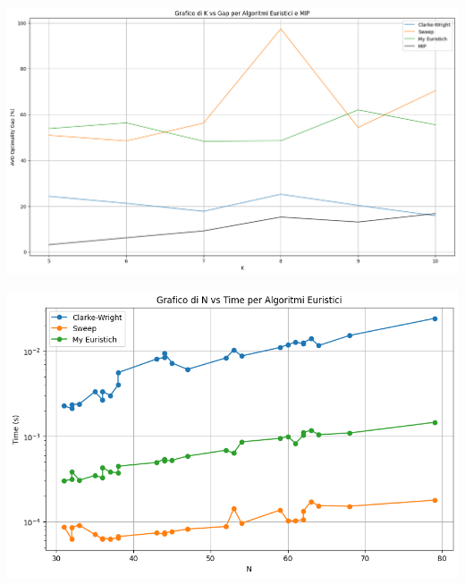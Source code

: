 \documentclass[compress]{beamer}
\begin{document}
\begin{frame}{\subsecname}
    \begin{center}
		\begin{minipage}{1\textwidth}
            \centering
            \includegraphics[width=1\linewidth]{images/K_gap.png}
        \end{minipage}
    \end{center}
\end{frame}

\begin{frame}{\subsecname}
    \begin{center}
		\begin{minipage}{1\textwidth}
            \centering
            \includegraphics[width=1\linewidth]{images/N_time.png}
        \end{minipage}
    \end{center}
\end{frame}
\end{document}
